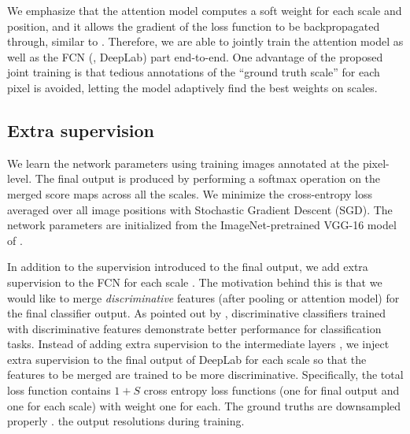 We emphasize that the attention model computes a soft weight for each scale and position, and it allows the gradient of the loss function to be backpropagated through, similar to \cite{bahdanau2014neural}. Therefore, we are able to jointly train the attention model as well as the FCN (\ie, DeepLab) part end-to-end. One advantage of the proposed joint training is that tedious annotations of the ``ground truth scale'' for each pixel is avoided, letting the model adaptively find the best weights on scales.

\subsection{Extra supervision} 
We learn the network parameters using training images annotated at the pixel-level. The final output is produced by performing a softmax operation on the merged score maps across all the scales. We minimize the cross-entropy loss averaged over all image positions with Stochastic Gradient Descent (SGD). The network parameters are initialized from the ImageNet-pretrained VGG-16 model of \cite{simonyan2014very}.

In addition to the supervision introduced to the final output, we add extra supervision to the FCN for each scale \cite{lee2014deeply}. The motivation behind this is that we would like to merge {\it discriminative} features (after pooling or attention model) for the final classifier output. As pointed out by \cite{lee2014deeply}, discriminative classifiers trained with discriminative features demonstrate better performance for classification tasks. Instead of adding extra supervision to the intermediate layers \cite{bengio2007greedy, lee2014deeply, szegedy2014going, xie2015holistically}, we inject extra supervision to the final output of DeepLab for each scale so that the features to be merged are trained to be more discriminative. Specifically, the total loss function contains $1+S$ cross entropy loss functions (one for final output and one for each scale) with weight one for each. The ground truths are downsampled properly \wrt. the output resolutions during training. %

